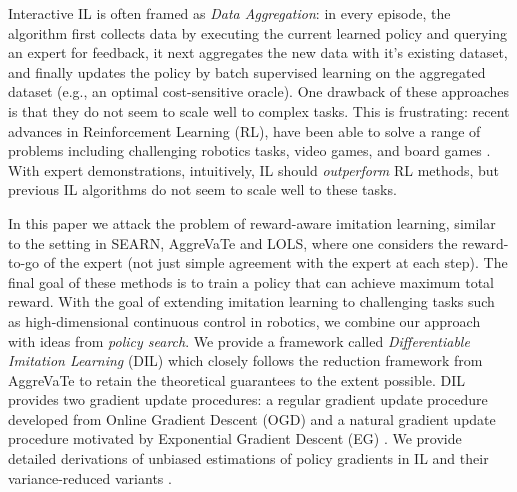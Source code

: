Interactive IL is often framed as \emph{Data Aggregation}: in every episode, the algorithm first collects data by executing the current learned policy and querying an expert for feedback, it next aggregates the new data with it's existing dataset, and finally updates the policy by batch supervised learning on the aggregated dataset (e.g., an optimal cost-sensitive oracle). One drawback of these approaches is that they do not seem to scale well to complex tasks. This is frustrating: recent advances in Reinforcement Learning (RL), have been able to solve a range of problems including challenging robotics tasks, video games, and board games \cite{schulman2015trust,duan2016benchmarking,silver2016mastering}. With expert demonstrations, intuitively, IL should \emph{outperform} RL methods, but previous IL algorithms do not seem to scale well to these tasks. 

In this paper we attack the problem of reward-aware imitation learning, similar to the setting in SEARN, AggreVaTe and LOLS, where one considers the reward-to-go of the expert (not just  simple agreement with the expert at each step).  The final goal of these methods is to train a policy that can achieve maximum total reward. 
With the goal of extending imitation learning to challenging tasks such as high-dimensional continuous control in robotics, we combine our approach with ideas from \emph{policy search}. We provide a framework called \emph{Differentiable  Imitation Learning} (DIL)  which closely follows the reduction framework from AggreVaTe \cite{ross2014reinforcement} to retain the theoretical guarantees to the extent possible. DIL provides two gradient update procedures: a regular gradient update procedure developed from Online Gradient Descent (OGD) \cite{Zinkevich2003_ICML} and a natural gradient update procedure motivated by Exponential Gradient Descent (EG) \cite{shalev2012online} . We provide detailed derivations of unbiased estimations of policy gradients in IL and their variance-reduced variants \cite{greensmith2004variance}. 


